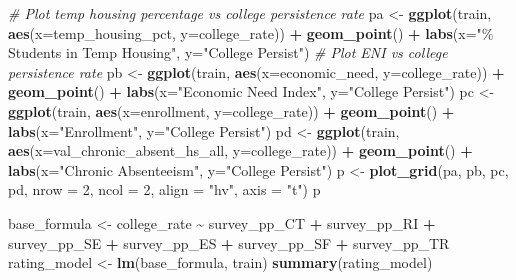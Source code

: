 \documentclass[
  man,floatsintext]{apa6}
\newenvironment{Shaded}{\begin{snugshade}}{\end{snugshade}}
\newcommand{\AttributeTok}[1]{\textcolor[rgb]{0.13,0.29,0.53}{#1}}
\newcommand{\CommentTok}[1]{\textcolor[rgb]{0.56,0.35,0.01}{\textit{#1}}}
\newcommand{\DecValTok}[1]{\textcolor[rgb]{0.00,0.00,0.81}{#1}}
\newcommand{\FunctionTok}[1]{\textcolor[rgb]{0.13,0.29,0.53}{\textbf{#1}}}
\newcommand{\NormalTok}[1]{#1}
\newcommand{\OtherTok}[1]{\textcolor[rgb]{0.56,0.35,0.01}{#1}}
\newcommand{\SpecialCharTok}[1]{\textcolor[rgb]{0.81,0.36,0.00}{\textbf{#1}}}
\newcommand{\StringTok}[1]{\textcolor[rgb]{0.31,0.60,0.02}{#1}}
\begin{document}
\begin{Shaded}
\begin{Highlighting}[]
\CommentTok{\# Plot temp housing percentage vs college persistence rate}
\NormalTok{pa }\OtherTok{\textless{}{-}} \FunctionTok{ggplot}\NormalTok{(train, }\FunctionTok{aes}\NormalTok{(}\AttributeTok{x=}\NormalTok{temp\_housing\_pct, }\AttributeTok{y=}\NormalTok{college\_rate)) }\SpecialCharTok{+}
  \FunctionTok{geom\_point}\NormalTok{() }\SpecialCharTok{+}
  \FunctionTok{labs}\NormalTok{(}\AttributeTok{x=}\StringTok{"\% Students in Temp Housing"}\NormalTok{,}
       \AttributeTok{y=}\StringTok{"College Persist"}\NormalTok{)}
\CommentTok{\# Plot ENI vs college persistence rate}
\NormalTok{pb }\OtherTok{\textless{}{-}} \FunctionTok{ggplot}\NormalTok{(train, }\FunctionTok{aes}\NormalTok{(}\AttributeTok{x=}\NormalTok{economic\_need, }\AttributeTok{y=}\NormalTok{college\_rate)) }\SpecialCharTok{+}
  \FunctionTok{geom\_point}\NormalTok{() }\SpecialCharTok{+}
  \FunctionTok{labs}\NormalTok{(}\AttributeTok{x=}\StringTok{"Economic Need Index"}\NormalTok{,}
       \AttributeTok{y=}\StringTok{"College Persist"}\NormalTok{)}
\NormalTok{pc }\OtherTok{\textless{}{-}} \FunctionTok{ggplot}\NormalTok{(train, }\FunctionTok{aes}\NormalTok{(}\AttributeTok{x=}\NormalTok{enrollment, }\AttributeTok{y=}\NormalTok{college\_rate)) }\SpecialCharTok{+}
  \FunctionTok{geom\_point}\NormalTok{() }\SpecialCharTok{+}
  \FunctionTok{labs}\NormalTok{(}\AttributeTok{x=}\StringTok{"Enrollment"}\NormalTok{,}
       \AttributeTok{y=}\StringTok{"College Persist"}\NormalTok{)}
\NormalTok{pd }\OtherTok{\textless{}{-}} \FunctionTok{ggplot}\NormalTok{(train, }\FunctionTok{aes}\NormalTok{(}\AttributeTok{x=}\NormalTok{val\_chronic\_absent\_hs\_all, }\AttributeTok{y=}\NormalTok{college\_rate)) }\SpecialCharTok{+}
  \FunctionTok{geom\_point}\NormalTok{() }\SpecialCharTok{+}
  \FunctionTok{labs}\NormalTok{(}\AttributeTok{x=}\StringTok{"Chronic Absenteeism"}\NormalTok{,}
       \AttributeTok{y=}\StringTok{"College Persist"}\NormalTok{)}
\NormalTok{p }\OtherTok{\textless{}{-}} \FunctionTok{plot\_grid}\NormalTok{(pa, pb, pc, pd, }\AttributeTok{nrow =} \DecValTok{2}\NormalTok{, }\AttributeTok{ncol =} \DecValTok{2}\NormalTok{, }\AttributeTok{align =} \StringTok{"hv"}\NormalTok{, }\AttributeTok{axis =} \StringTok{"t"}\NormalTok{)}
\NormalTok{p}

\NormalTok{base\_formula }\OtherTok{\textless{}{-}}\NormalTok{ college\_rate }\SpecialCharTok{\textasciitilde{}}\NormalTok{ survey\_pp\_CT }\SpecialCharTok{+}\NormalTok{ survey\_pp\_RI }\SpecialCharTok{+}\NormalTok{ survey\_pp\_SE }\SpecialCharTok{+}\NormalTok{ survey\_pp\_ES }\SpecialCharTok{+}\NormalTok{ survey\_pp\_SF }\SpecialCharTok{+}\NormalTok{ survey\_pp\_TR}
\NormalTok{rating\_model }\OtherTok{\textless{}{-}} \FunctionTok{lm}\NormalTok{(base\_formula,}
\NormalTok{                   train)}
\FunctionTok{summary}\NormalTok{(rating\_model)}


\end{Highlighting}
\end{Shaded}
\end{document}
